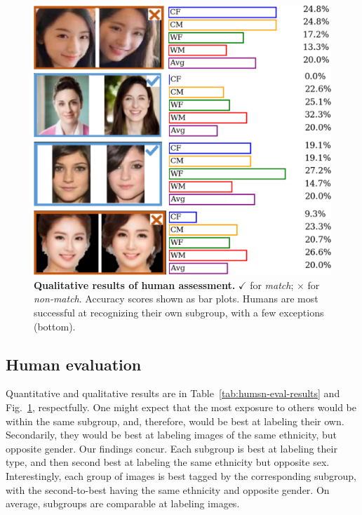 \begin{figure}[t!] 
	\centering    
	\includegraphics[width=\linewidth] {figures/human_eval.pdf}
		\caption{\small{\textbf{Qualitative results of human assessment.} $\checkmark$ for \emph{match}; $\times$ for \emph{non-match}. Accuracy scores shown as bar plots. Humans are most successful at recognizing their own subgroup, with a few exceptions (\eg bottom).}}
		\label{fig:human-eval} 
		\vspace{-5mm}
\end{figure} 
\vspace{-2mm}
\subsection{Human evaluation}
 Quantitative and qualitative results are in Table~\ref{tab:humsn-eval-results} and Fig.~\ref{fig:human-eval}, respectfully. One might expect that the most exposure to others would be within the same subgroup, and, therefore, would be best at labeling their own. Secondarily, they would be best at labeling images of the same ethnicity, but opposite gender. Our findings concur. Each subgroup is best at labeling their type, and then second best at labeling the same ethnicity but opposite sex. Interestingly, each group of images is best tagged by the corresponding subgroup, with the second-to-best having the same ethnicity and opposite gender. On average, subgroups are comparable at labeling images. 



